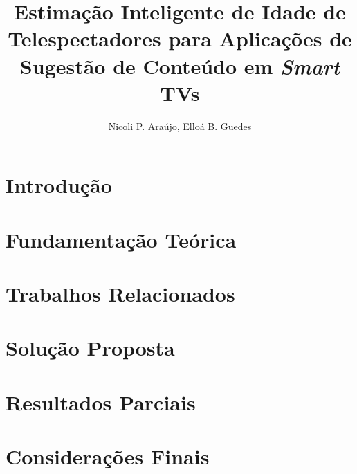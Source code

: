 \documentclass[12pt]{article}
\title{Estimação Inteligente de Idade de Telespectadores para Aplicações de Sugestão de Conteúdo em \emph{Smart} TVs}
\author{Nicoli P. Araújo, Elloá B. Guedes}
\begin{document}

\maketitle



\section{Introdução}\label{sec:intro}


\section{Fundamentação Teórica}\label{sec:fund_teorica}


\section{Trabalhos Relacionados}\label{sec:trab_relac}


\section{Solução Proposta}\label{sec:solucao_proposta}


\section{Resultados Parciais}

\section{Considerações Finais}\label{sec:consid_finais}




\end{document}
